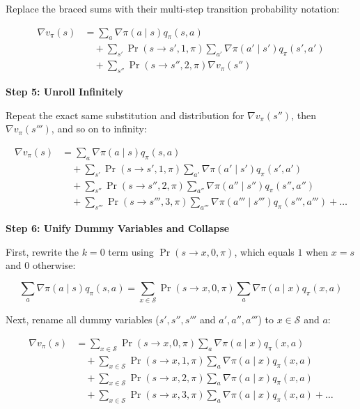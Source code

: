\documentclass{article}
\begin{document}
Replace the braced sums with their multi-step transition probability notation:

\begin{align*}
\nabla v_{\pi}(s) &= \sum_{a} \nabla \pi(a \mid s) q_{\pi}(s, a) \\
&\quad + \sum_{s'} \operatorname{Pr}(s \to s', 1, \pi) \sum_{a'} \nabla \pi(a' \mid s') q_{\pi}(s', a') \\
&\quad + \sum_{s''} \operatorname{Pr}(s \to s'', 2, \pi) \nabla v_{\pi}(s'')
\end{align*}

\textbf{Step 5: Unroll Infinitely}

Repeat the exact same substitution and distribution for $\nabla v_{\pi}(s'')$, then $\nabla v_{\pi}(s''')$, and so on to infinity:

\begin{align*}
\nabla v_{\pi}(s) &= \sum_{a} \nabla \pi(a \mid s) q_{\pi}(s, a) \\
&\quad + \sum_{s'} \operatorname{Pr}(s \to s', 1, \pi) \sum_{a'} \nabla \pi(a' \mid s') q_{\pi}(s', a') \\
&\quad + \sum_{s''} \operatorname{Pr}(s \to s'', 2, \pi) \sum_{a''} \nabla \pi(a'' \mid s'') q_{\pi}(s'', a'') \\
&\quad + \sum_{s'''} \operatorname{Pr}(s \to s''', 3, \pi) \sum_{a'''} \nabla \pi(a''' \mid s''') q_{\pi}(s''', a''') + \dots
\end{align*}

\textbf{Step 6: Unify Dummy Variables and Collapse}

First, rewrite the $k=0$ term using $\operatorname{Pr}(s \to x, 0, \pi)$, which equals $1$ when $x = s$ and $0$ otherwise:

\begin{equation*}
\sum_{a} \nabla \pi(a \mid s) q_{\pi}(s, a) = \sum_{x \in \mathcal{S}} \operatorname{Pr}(s \to x, 0, \pi) \sum_{a} \nabla \pi(a \mid x) q_{\pi}(x, a)
\end{equation*}

Next, rename all dummy variables ($s', s'', s'''$ and $a', a'', a'''$) to $x \in \mathcal{S}$ and $a$:

\begin{align*}
\nabla v_{\pi}(s) &= \sum_{x \in \mathcal{S}} \operatorname{Pr}(s \to x, 0, \pi) \sum_{a} \nabla \pi(a \mid x) q_{\pi}(x, a) \\
&\quad + \sum_{x \in \mathcal{S}} \operatorname{Pr}(s \to x, 1, \pi) \sum_{a} \nabla \pi(a \mid x) q_{\pi}(x, a) \\
&\quad + \sum_{x \in \mathcal{S}} \operatorname{Pr}(s \to x, 2, \pi) \sum_{a} \nabla \pi(a \mid x) q_{\pi}(x, a) \\
&\quad + \sum_{x \in \mathcal{S}} \operatorname{Pr}(s \to x, 3, \pi) \sum_{a} \nabla \pi(a \mid x) q_{\pi}(x, a) + \dots
\end{align*}
\end{document}
